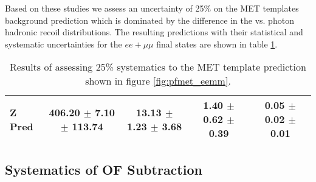 \newcommand{\systpercentage}{25\% }

Based on these studies we assess an uncertainty of \systpercentage
on the MET templates background prediction
which is dominated by the difference in the \Z vs. photon hadronic recoil \pt distributions.
The resulting predictions with their statistical and systematic uncertainties for the $ee+\mu\mu$ 
final states are shown in table \ref{tab:templatesystres}.


\begin{table}[hbt]
  \begin{center}
	\caption{
	  \label{tab:templatesystres} 
	  Results of assessing \systpercentage systematics to the MET template prediction shown in figure \ref{fig:pfmet_eemm}.
	}
	\begin{tabular}{lcccc}
	  \hline
	  \resulttitle
\hline
Z Pred & 406.20 $\pm$ 7.10 $\pm$ 113.74  &    13.13 $\pm$ 1.23 $\pm$ 3.68  &     1.40 $\pm$ 0.62 $\pm$ 0.39  &     0.05 $\pm$ 0.02 $\pm$ 0.01 \\

\hline
	\end{tabular}
  \end{center}
\end{table}






\subsection{Systematics of OF Subtraction}
\label{sec:systematicsof}

\newcommand{\ofsystpercentage}{3.6\% }

